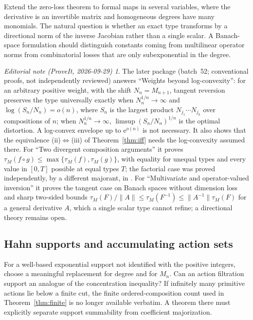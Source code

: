 \documentclass[11pt,a4paper]{article}
\numberwithin{equation}{section}
\theoremstyle{definition}
\theoremstyle{remark}
\newtheorem*{ednote}{Editorial note (ProveIt, 2026-09-29)}
\newcommand{\typ}{\tau_M}
\newcommand{\ee}{\mathrm e}
\begin{document}
Extend the zero-loss theorem to formal maps in several variables,
where the derivative is an invertible matrix and homogeneous degrees
have many monomials. The natural question is whether an exact type
transforms by a directional norm of the inverse Jacobian rather than a
single scalar. A Banach-space formulation should distinguish constants
coming from multilinear operator norms from combinatorial losses that
are only subexponential in the degree.
\begin{ednote}
The later package \cite{ed:etb} (batch~52; conventional proofs, not
independently reviewed) answers ``Weights beyond log-convexity'': for an
arbitrary positive weight, with the shift $N_n=M_{n+1}$, tangent reversion
preserves the type universally exactly when $N_n^{1/n}\to\infty$ and
$\log(S_n/N_n)=o(n)$, where $S_n$ is the largest product
$N_{j_1}\cdots N_{j_k}$ over compositions of $n$; when $N_n^{1/n}\to\infty$,
$\limsup(S_n/N_n)^{1/n}$ is the optimal distortion. A log-convex envelope up
to $\ee^{o(n)}$ is not necessary. It also shows that the equivalence
(ii)$\Leftrightarrow$(iii) of Theorem~\ref{thm:iff} needs the
log-convexity assumed there. For ``Two divergent composition arguments'' it
proves $\typ(f\circ g)\le\max\{\typ(f),\typ(g)\}$, with equality for unequal types and
every value in $[0,T]$ possible at equal types $T$; the factorial case was
proved independently, by a different majorant, in \cite{ed:ssc}. For
``Multivariate and operator-valued inversion'' it proves the tangent case on
Banach spaces without dimension loss and sharp two-sided bounds
$\typ(F)/\|A\|\le\typ(F^{-1})\le\|A^{-1}\|\typ(F)$ for a general derivative $A$,
which a single scalar type cannot refine; a directional theory remains open.
\end{ednote}

\subsection{Hahn supports and accumulating action sets}

For a well-based exponential support not identified with the positive
integers, choose a meaningful replacement for degree and for $M_n$.
Can an action filtration support an analogue of the concentration
inequality? If infinitely many primitive actions lie below a finite
cut, the finite ordered-composition count used in
Theorem~\ref{thm:finite} is no longer available verbatim. A theorem
there must explicitly separate support summability from coefficient
majorization.
\end{document}

